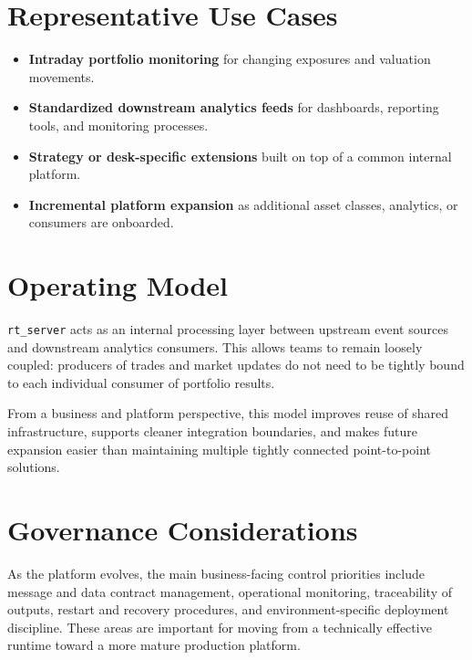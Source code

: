 \documentclass[10pt]{article}
\begin{document}
\begin{minipage}[t]{0.48\textwidth}
	\section*{\textcolor{brandblue}{Representative Use Cases}}
	\begin{itemize}
		\item \textbf{Intraday portfolio monitoring} for changing exposures and valuation movements.
		\item \textbf{Standardized downstream analytics feeds} for dashboards, reporting tools, and monitoring processes.
		\item \textbf{Strategy or desk-specific extensions} built on top of a common internal platform.
		\item \textbf{Incremental platform expansion} as additional asset classes, analytics, or consumers are onboarded.
	\end{itemize}
\end{minipage}
\hfill
\begin{minipage}[t]{0.48\textwidth}
	\section*{\textcolor{brandblue}{Operating Model}}
	\texttt{rt\_server} acts as an internal processing layer between upstream event sources and downstream analytics consumers. This allows teams to remain loosely coupled: producers of trades and market updates do not need to be tightly bound to each individual consumer of portfolio results.

	\vspace{0.8em}

	From a business and platform perspective, this model improves reuse of shared infrastructure, supports cleaner integration boundaries, and makes future expansion easier than maintaining multiple tightly connected point-to-point solutions.
\end{minipage}

\vspace{1.8em}

\section*{\textcolor{brandblue}{Governance Considerations}}

As the platform evolves, the main business-facing control priorities include message and data contract management, operational monitoring, traceability of outputs, restart and recovery procedures, and environment-specific deployment discipline. These areas are important for moving from a technically effective runtime toward a more mature production platform.
\end{document}
